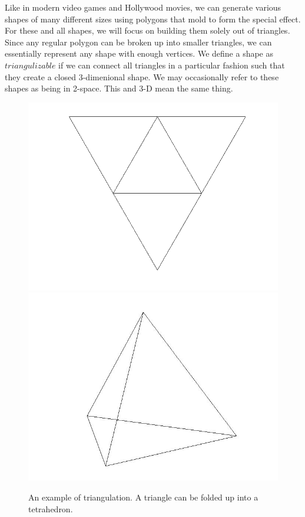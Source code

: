\documentclass[12pt]{article}
\begin{document}
  \noindent Like in modern video games and Hollywood movies, we can generate various shapes of many different sizes using polygons that mold to form the special effect. For these and all shapes, we will focus on building them solely out of triangles. Since any regular polygon can be broken up into smaller triangles, we can essentially represent any shape with enough vertices. We define a shape as $triangulizable$ if we can connect all triangles in a particular fashion such that they create a closed 3-dimenional shape. We may occasionally refer to these shapes as being in 2-space. This and 3-D mean the same thing. \newline
\begin{figure}
\includegraphics[scale = 0.5]{flattetrahedron.png}
\includegraphics[scale = 0.3]{tetrahedron.jpg}
\caption{An example of triangulation. A triangle can be folded up into a tetrahedron.}
\end{figure}
\end{document}
